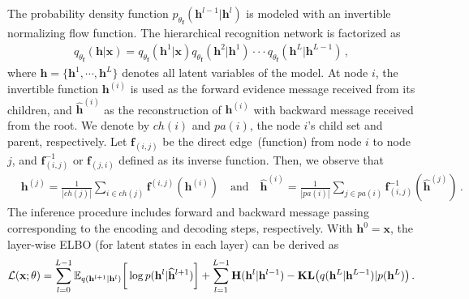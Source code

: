 \documentclass{article} %
\begin{document}
The probability density function $p_{\theta_{\mathbf{f}}}(\mathbf{h}^{l-1} | \mathbf{h}^{l})$ is modeled with an invertible normalizing flow function.
The hierarchical recognition network is factorized as
\begin{align*}
q_{\theta_{\mathbf{f}}}(\mathbf{h}| \mathbf{x}) =  q_{\theta_{\mathbf{f}}}(\mathbf{h}^1 | \mathbf{x})  q_{\theta_{\mathbf{f}}}(\mathbf{h}^2 | \mathbf{h}^1) \cdot \cdot  \cdot  q_{\theta_{\mathbf{f}}}(\mathbf{h}^{L} | \mathbf{h}^{L-1}) \, ,
\end{align*}
where $\mathbf{h}=\{\mathbf{h}^1, \cdots, \mathbf{h}^L \}$ denotes all latent variables of the model.
At node $i$, the invertible function $\mathbf{h}^{(i)}$ is used as the forward evidence message received from its children, and $\widehat{\mathbf{h}}^{(i)}$ as the  reconstruction of $\mathbf{h}^{(i)}$ with backward message received from the root. 
We denote by $ch(i)$ and $pa(i)$, the node $i$'s child set and parent, respectively. 
Let $\mathbf{f}_{(i, j)}$ be the direct edge~(function) from node $i$ to node $j$, and $\mathbf{f}^{-1}_{ (i, j)}$ or  $\mathbf{f}_{ (j, i)}$ defined as its inverse function.
 Then, we observe that
\begin{align*}
&  \mathbf{h}^{(j)} = \frac{1}{|ch(j)|} \sum_{i \in ch(j) } \mathbf{f}^{(i,j)}(\mathbf{h}^{(i)})  \quad \textrm{and} \quad \widehat{\mathbf{h}}^{(i)} = \frac{1}{|pa(i)|} \sum_{j \in pa(i) } \mathbf{f}^{-1}_{ (i,j)}(\widehat{\mathbf{h}}^{(j)}) \, .
\end{align*} 
The inference procedure includes forward and backward message passing corresponding to the encoding and decoding steps, respectively. 
With $\mathbf{h}^0 = \mathbf{x}$, the layer-wise ELBO (for latent states in each layer) can be derived as 
\begin{align} \label{eq:elbo_tree}
\mathcal{L}(\mathbf{x}; \theta) =  \sum_{l=0}^{L-1}  \mathbb{E}_{q(\mathbf{h}^{l+1}|\mathbf{h}^l)} \bigg[ \log p( \mathbf{h}^{l}|  \widehat{\mathbf{h}}^{l+1})   \bigg] +  \sum_{l=1}^{L-1}   \textbf{\text{H}}(\mathbf{h}^l | \mathbf{h}^{l-1} )   -   \textbf{\text{KL}}\big(q(\mathbf{h}^L | \mathbf{h}^{L-1} )   | p(\mathbf{h}^L)  \big) \, .  
\end{align}
\end{document}
